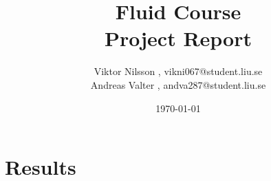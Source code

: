 \documentclass[]{report}   %
\begin{document}
\title{Fluid Course\\ Project Report}   %
\author{
	Viktor Nilsson , vikni067@student.liu.se 
	\\Andreas Valter , andva287@student.liu.se
	}
\date{\today}    %
\maketitle

\setcounter{page}{2}





\begingroup
\let\clearpage\relax %
\chapter{Results}
	
	
\endgroup



\end{document}
